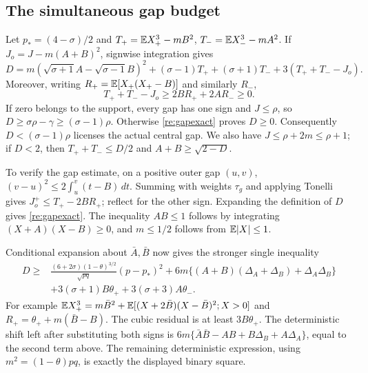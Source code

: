 \subsection{The simultaneous gap budget}
Let $p_*=(4-\sigma)/2$ and
$T_+=\mathbb E X_+^3-mB^2$, $T_-=\mathbb E X_-^3-mA^2$.
If $J_o=J-m(A+B)^2$, signwise integration gives
\begin{equation}\label{re:gapexact}
 D=m(\sqrt{\sigma+1}A-\sqrt{\sigma-1}B)^2
   +(\sigma-1)T_++(\sigma+1)T_-+3(T_++T_--J_o).
\end{equation}
Moreover, writing $R_+=\mathbb E[X_+(X_+-B)]$ and similarly $R_-$,
\[
 T_++T_--J_o\ge2BR_++2AR_-\ge0.
\]
If zero belongs to the support, every gap has one sign and $J\le\rho$,
so $D\ge\sigma\rho-\gamma\ge(\sigma-1)\rho$.
Otherwise \eqref{re:gapexact} proves $D\ge0$.
Consequently $D<(\sigma-1)\rho$ licenses the actual central gap.
We also have $J\le\rho+2m\le\rho+1$; if $D<2$, then
$T_++T_-\le D/2$ and $A+B\ge\sqrt{2-D}$.

To verify the gap estimate, on a positive outer gap $(u,v)$,
$(v-u)^2\le2\int_u^v(t-B)\,dt$.
Summing with weights $\tau_g$ and applying Tonelli gives
$J_o^+\le T_+-2BR_+$; reflect for the other sign.
Expanding the definition of $D$ gives \eqref{re:gapexact}.
The inequality $AB\le1$ follows by integrating $(X+A)(X-B)\ge0$,
and $m\le1/2$ follows from $\mathbb E|X|\le1$.

Conditional expansion about $\bar A,\bar B$ now gives the stronger
single inequality
\begin{equation}\label{re:joint}
\begin{split}
 D\ge{}&\frac{(6+2\sigma)(1-\theta)^{3/2}}{\sqrt{pq}}(p-p_*)^2
 +6m\{(A+B)(\Delta_A+\Delta_B)+\Delta_A\Delta_B\}\\
 &+3(\sigma+1)B\theta_++3(\sigma+3)A\theta_-.
\end{split}
\end{equation}
For example
$\mathbb E X_+^3=m\bar B^2+\mathbb E[(X+2\bar B)(X-\bar B)^2;X>0]$
and $R_+=\theta_++m(\bar B-B)$.
The cubic residual is at least $3B\theta_+$.
The deterministic shift left after substituting both signs is
$6m\{\bar A\bar B-AB+B\Delta_B+A\Delta_A\}$, equal to the
second term above. The remaining deterministic expression, using
$m^2=(1-\theta)pq$, is exactly the displayed binary square.

